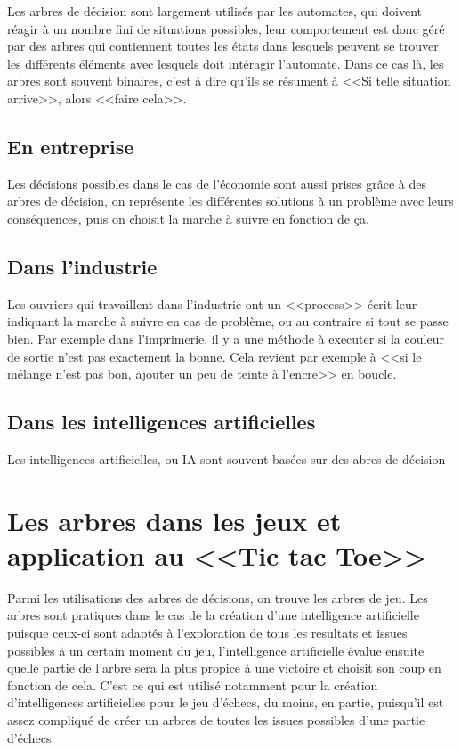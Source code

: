 \documentclass{article}
\begin{document}
Les arbres de décision sont largement utilisés par les automates,
 qui doivent réagir à un nombre fini de situations possibles,
leur comportement est donc géré par des arbres qui contiennent
 toutes les états dans lesquels peuvent se trouver les différents
éléments avec lesquels doit intéragir l'automate.
Dans ce cas là, les arbres sont souvent binaires,
c'est à dire qu'ils se résument à <<Si telle situation arrive>>, alors <<faire
cela>>.

\subsection{En entreprise}

Les décisions possibles dans le cas de l'économie sont aussi prises grâce à des
arbres de décision,
on représente les différentes solutions à un problème avec leurs conséquences,
puis on choisit
la marche à suivre en fonction de ça.

\subsection{Dans l'industrie}

Les ouvriers qui travaillent dans l'industrie ont un <<process>> écrit
leur indiquant la marche à suivre en cas de problème,
ou au contraire si tout se passe bien. Par exemple dans l'imprimerie, il y a une
méthode à executer si la
couleur de sortie n'est pas exactement la bonne.
Cela revient par exemple à <<si le mélange n'est pas bon, ajouter un peu de
teinte à l'encre>> en boucle.


\subsection{Dans les intelligences artificielles}

Les intelligences artificielles, ou IA sont souvent basées sur des abres de
décision

\section{Les arbres dans les jeux et application au <<Tic tac Toe>>}

Parmi les utilisations des arbres de décisions, on trouve les arbres de jeu.
Les arbres sont pratiques dans le cas de la création d'une intelligence
artificielle puisque
ceux-ci sont adaptés à l'exploration
de tous les resultats et issues possibles à un certain moment du jeu,
l'intelligence artificielle évalue ensuite quelle partie de l'arbre sera la plus
propice à une victoire et choisit son coup en fonction de cela. C'est ce qui est
utilisé notamment pour la création d'intelligences
artificielles pour le jeu d'échecs, du moins, en partie, puisqu'il est assez compliqué de créer
 un arbres de toutes les issues possibles d'une partie d'échecs.
\end{document}

